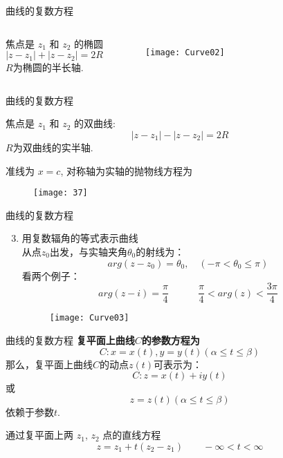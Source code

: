 \documentclass{beamer}
\begin{document}
\begin{frame}{曲线的复数方程}



\begin{example}

\begin{columns}
焦点是 $ z_1 $ 和 $ z_2 $ 的椭圆
\[ |z - z_1 | + | z - z_2| = 2R \]
$R$为椭圆的半长轴.

\begin{figure}[htbp]
\texttt{[image: Curve02]}
\end{figure}
\end{columns}


\end{example}


\end{frame}


\begin{frame}{曲线的复数方程}
\begin{example}
焦点是 $ z_1 $ 和 $ z_2 $ 的双曲线: 
\[ |z - z_1 | - | z - z_2| = 2R \]
$R$为双曲线的实半轴.
\end{example}

\begin{example}
准线为 $ x=c $, 对称轴为实轴的抛物线方程为
\begin{figure}
\texttt{[image: 37]}
\end{figure}
\end{example}
\end{frame}


\begin{frame}{曲线的复数方程}

\begin{enumerate}
	\setcounter{enumi}{2}
	\item 用复数辐角的等式表示曲线\\
	从点$z_0$出发，与实轴夹角$\theta_0$的射线为：
	$$arg (z-z_0) = \theta_0,\quad (-\pi < \theta_0 \leq \pi)$$
	看两个例子：\\
	$$arg (z-i) = \frac{\pi}{4} \quad  \quad  \quad \frac{\pi}{4} < arg (z) < \frac{3\pi}{4} $$
\begin{figure}
\texttt{[image: Curve03]}
\end{figure}
\end{enumerate}
\end{frame}

\begin{frame}{曲线的复数方程}
\textbf{复平面上曲线$C$的参数方程为}\\
$$C: x=x(t), y=y(t) (\alpha \leq t \leq \beta)$$
那么，复平面上曲线$C$的动点$z(t)$可表示为：
$$C: z= x (t) + iy(t) $$
或
$$z=z(t) (\alpha \leq t \leq \beta)$$
依赖于参数$t$.

\begin{example}
通过复平面上两 $ z_1 $,  $ z_2 $ 点的直线方程
\[ z = z_1+ t (z_2-z_1)\qquad -\infty<t <\infty \]
\end{example}

\end{frame}
\end{document}
